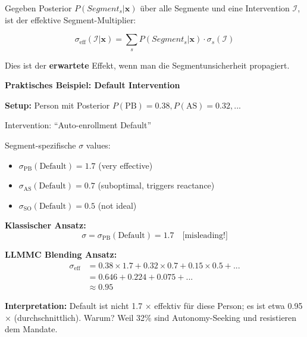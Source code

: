 \begin{definition}
\label{def:19-sigma-effective}

Gegeben Posterior $P(Segment_s | \mathbf{x})$ über alle Segmente und eine Intervention $\mathcal{I}$, ist der effektive Segment-Multiplier:

\begin{equation}
\boxed{\sigma_{\text{eff}}(\mathcal{I} | \mathbf{x}) = \sum_s P(Segment_s | \mathbf{x}) \cdot \sigma_s(\mathcal{I})}
\label{eq:19-effective-sigma}
\end{equation}

Dies ist der \textbf{erwartete} Effekt, wenn man die Segmentunsicherheit propagiert.

\end{definition}

\textbf{Praktisches Beispiel: Default Intervention}

\textbf{Setup:} Person mit Posterior $P(\text{PB})=0.38, P(\text{AS})=0.32, ...$

Intervention: ``Auto-enrollment Default''

Segment-spezifische $\sigma$ values:
\begin{itemize}[nosep]
\item $\sigma_{\text{PB}}(\text{Default}) = 1.7$ (very effective)
\item $\sigma_{\text{AS}}(\text{Default}) = 0.7$ (suboptimal, triggers reactance)
\item $\sigma_{\text{SO}}(\text{Default}) = 0.5$ (not ideal)
\end{itemize}

\textbf{Klassischer Ansatz:}
\begin{equation}
\sigma = \sigma_{\text{PB}}(\text{Default}) = 1.7 \quad \text{[misleading!]}
\end{equation}

\textbf{LLMMC Blending Ansatz:}
\begin{equation}
\begin{aligned}
\sigma_{\text{eff}} &= 0.38 \times 1.7 + 0.32 \times 0.7 + 0.15 \times 0.5 + ... \\
&= 0.646 + 0.224 + 0.075 + ... \\
&\approx 0.95
\end{aligned}
\end{equation}

\textbf{Interpretation:} Default ist nicht 1.7 × effektiv für diese Person; es ist etwa 0.95 × (durchschnittlich). Warum? Weil 32\% sind Autonomy-Seeking und resistieren dem Mandate.

